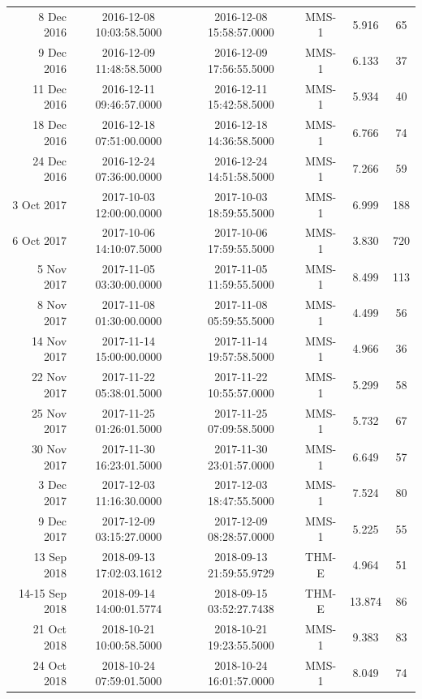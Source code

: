 \begin{longtable}{r|ccccc}
8 Dec 2016     &  2016-12-08 10:03:58.5000 &  2016-12-08 15:58:57.0000 &  MMS-1 &    5.916 &     65 \\
9 Dec 2016     &  2016-12-09 11:48:58.5000 &  2016-12-09 17:56:55.5000 &  MMS-1 &    6.133 &     37 \\
11 Dec 2016    &  2016-12-11 09:46:57.0000 &  2016-12-11 15:42:58.5000 &  MMS-1 &    5.934 &     40 \\
18 Dec 2016    &  2016-12-18 07:51:00.0000 &  2016-12-18 14:36:58.5000 &  MMS-1 &    6.766 &     74 \\
24 Dec 2016    &  2016-12-24 07:36:00.0000 &  2016-12-24 14:51:58.5000 &  MMS-1 &    7.266 &     59 \\
3 Oct 2017     &  2017-10-03 12:00:00.0000 &  2017-10-03 18:59:55.5000 &  MMS-1 &    6.999 &    188 \\
6 Oct 2017     &  2017-10-06 14:10:07.5000 &  2017-10-06 17:59:55.5000 &  MMS-1 &    3.830 &    720 \\
5 Nov 2017     &  2017-11-05 03:30:00.0000 &  2017-11-05 11:59:55.5000 &  MMS-1 &    8.499 &    113 \\
8 Nov 2017     &  2017-11-08 01:30:00.0000 &  2017-11-08 05:59:55.5000 &  MMS-1 &    4.499 &     56 \\
14 Nov 2017    &  2017-11-14 15:00:00.0000 &  2017-11-14 19:57:58.5000 &  MMS-1 &    4.966 &     36 \\
22 Nov 2017    &  2017-11-22 05:38:01.5000 &  2017-11-22 10:55:57.0000 &  MMS-1 &    5.299 &     58 \\
25 Nov 2017    &  2017-11-25 01:26:01.5000 &  2017-11-25 07:09:58.5000 &  MMS-1 &    5.732 &     67 \\
30 Nov 2017    &  2017-11-30 16:23:01.5000 &  2017-11-30 23:01:57.0000 &  MMS-1 &    6.649 &     57 \\
3 Dec 2017     &  2017-12-03 11:16:30.0000 &  2017-12-03 18:47:55.5000 &  MMS-1 &    7.524 &     80 \\
9 Dec 2017     &  2017-12-09 03:15:27.0000 &  2017-12-09 08:28:57.0000 &  MMS-1 &    5.225 &     55 \\
13 Sep 2018    &  2018-09-13 17:02:03.1612 &  2018-09-13 21:59:55.9729 &  THM-E &    4.964 &     51 \\
14-15 Sep 2018 &  2018-09-14 14:00:01.5774 &  2018-09-15 03:52:27.7438 &  THM-E &   13.874 &     86 \\
21 Oct 2018    &  2018-10-21 10:00:58.5000 &  2018-10-21 19:23:55.5000 &  MMS-1 &    9.383 &     83 \\
24 Oct 2018    &  2018-10-24 07:59:01.5000 &  2018-10-24 16:01:57.0000 &  MMS-1 &    8.049 &     74 \\

\end{longtable}

